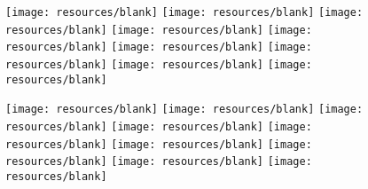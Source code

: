 \documentclass[11pt]{article}
\begin{document}
\begin{figure}[htbp]
\begin{minipage}[t]{0.250\textwidth}
  \end{minipage}%
  \begin{minipage}[t]{0.125\textwidth} %
  \end{minipage}%
  \begin{minipage}[t]{0.125\textwidth} %
    \centering
    \vspace{-0.3871\linewidth} %
    \texttt{[image: resources/blank]}
    \texttt{[image: resources/blank]}
    \texttt{[image: resources/blank]}
    \texttt{[image: resources/blank]}
    \texttt{[image: resources/blank]}
    \texttt{[image: resources/blank]}
    \texttt{[image: resources/blank]}
    \texttt{[image: resources/blank]}
    \texttt{[image: resources/blank]}

  \end{minipage}%
  \begin{minipage}[t]{0.125\textwidth} %
    \centering
    \texttt{[image: resources/blank]}
    \texttt{[image: resources/blank]}
    \texttt{[image: resources/blank]}
    \texttt{[image: resources/blank]}
    \texttt{[image: resources/blank]}
    \texttt{[image: resources/blank]}
    \texttt{[image: resources/blank]}
    \texttt{[image: resources/blank]}
    \texttt{[image: resources/blank]}


\end{minipage}
\end{figure}
\end{document}
